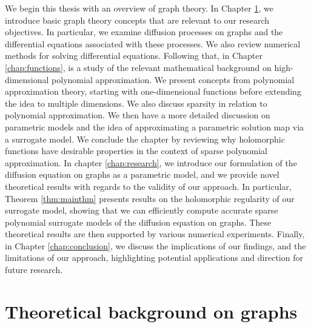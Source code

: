 \documentclass[12pt, oneside]{report}   	%
\begin{document}
We begin this thesis with an overview of graph theory. In Chapter \ref{chap:graphs}, we introduce basic graph theory concepts that are relevant to our research objectives. In particular, we examine diffusion processes on graphs and the differential equations associated with these processes. We also review numerical methods for solving differential equations. Following that, in Chapter \ref{chap:functions}, is a study of the relevant mathematical background on high-dimensional polynomial approximation. We present concepts from polynomial approximation theory, starting with one-dimensional functions before extending the idea to multiple dimensions. We also discuss sparsity in relation to polynomial approximation. We then have a more detailed discussion on parametric models and the idea of approximating a parametric solution map via a surrogate model. We conclude the chapter by reviewing why holomorphic functions have desirable properties in the context of sparse polynomial approximation. In chapter \ref{chap:research}, we introduce our formulation of the diffusion equation on graphs as a parametric model, and we provide novel theoretical results with regards to the validity of our approach. In particular, Theorem \ref{thm:mainthm} presents results on the holomorphic regularity of our surrogate model, showing that we can efficiently compute accurate sparse polynomial surrogate models of the diffusion equation on graphs. These theoretical results are then supported by various numerical experiments. Finally, in Chapter \ref{chap:conclusion}, we discuss the implications of our findings, and the limitations of our approach, highlighting potential applications and direction for future research.



\newpage


\chapter{Theoretical background on graphs}
\label{chap:graphs}
\end{document}
